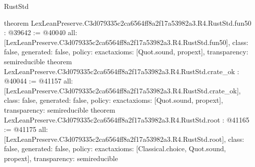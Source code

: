 \begin{lexlean}{RustStd}
\begin{coremodule}
{}
theorem LexLeanPreserve.C3d079335c2ca6564ff8a2f17a53982a3.R4.RustStd.fun50 : @39642 := @40040 {
  all: [LexLeanPreserve.C3d079335c2ca6564ff8a2f17a53982a3.R4.RustStd.fun50],
  class: false,
  generated: false,
  policy: exact{axioms: [Quot.sound, propext]},
  transparency: semireducible
}
theorem LexLeanPreserve.C3d079335c2ca6564ff8a2f17a53982a3.R4.RustStd.crate_ok : @40044 := @41157 {
  all: [LexLeanPreserve.C3d079335c2ca6564ff8a2f17a53982a3.R4.RustStd.crate_ok],
  class: false,
  generated: false,
  policy: exact{axioms: [Quot.sound, propext]},
  transparency: semireducible
}
theorem LexLeanPreserve.C3d079335c2ca6564ff8a2f17a53982a3.R4.RustStd.root : @41165 := @41175 {
  all: [LexLeanPreserve.C3d079335c2ca6564ff8a2f17a53982a3.R4.RustStd.root],
  class: false,
  generated: false,
  policy: exact{axioms: [Classical.choice, Quot.sound, propext]},
  transparency: semireducible
}


\end{coremodule}
\end{lexlean}
